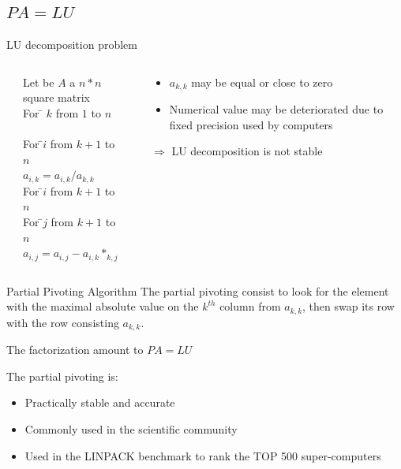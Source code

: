 \subsection{$PA=LU$}
\begin{frame}{LU decomposition problem}
\begin{columns}[c]
\begin{column}{0.02\textwidth}
\end{column}
\begin{column}{0.45\textwidth}
\begin{tabbing}
Let be $A$ a $n*n$ square matrix\\
For \= $k$ from $1$ to $n$\\
\>\\
\> For \=$i$ from $k+1$ to $n$\\
\>\> $a_{i,k} = a_{i,k}/a_{k,k}$\\
\> For \=$i$ from $k+1$ to $n$\\
\>\> For \=$j$ from $k+1$ to $n$\\
\>\>\> $a_{i,j} = a_{i,j}-a_{i,k}*_{k,j}$\\
\end{tabbing}
\end{column}
\begin{column}{0.02\textwidth}
\end{column}
\begin{column}{0.45\textwidth}
\begin{scriptsize}
\begin{itemize}
\item $a_{k,k}$ may be equal or close to zero
\item Numerical value may be deteriorated due to fixed precision used by computers
\end{itemize}
\pause
$\Rightarrow$ LU decomposition is not stable
\end{scriptsize}
\end{column}
\end{columns}
\end{frame}

\begin{frame}{Partial Pivoting Algorithm}
The partial pivoting consist to look for the element with the maximal absolute value on the $k^{th}$ column from $a_{k,k}$, then swap its row with the row consisting $a_{k,k}$.
\begin{flushleft}
The factorization amount to $PA=LU$
\end{flushleft}
\begin{flushleft}
The partial pivoting is:
\begin{itemize}
\item Practically stable and accurate
\item Commonly used in the scientific community
\item Used in the LINPACK benchmark to rank the TOP 500 super-computers
\end{itemize}
\end{flushleft}
\end{frame}

